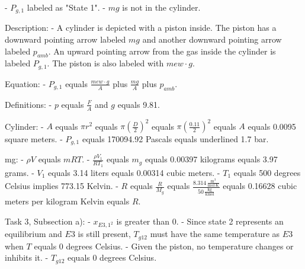 - \( P_{g,1} \) labeled as "State 1".
- \( mg \) is not in the cylinder.

Description:
- A cylinder is depicted with a piston inside. The piston has a downward pointing arrow labeled \( mg \) and another downward pointing arrow labeled \( p_{amb} \). An upward pointing arrow from the gas inside the cylinder is labeled \( P_{g,1} \). The piston is also labeled with \( mew \cdot g \).

Equation:
- \( P_{g,1} \) equals \( \frac{mew \cdot g}{A} \) plus \( \frac{mg}{A} \) plus \( p_{amb} \).

Definitions:
- \( p \) equals \( \frac{F}{A} \) and \( g \) equals 9.81.

Cylinder:
- \( A \) equals \( \pi r^2 \) equals \( \pi \left( \frac{D}{2} \right)^2 \) equals \( \pi \left( \frac{0.11}{2} \right)^2 \) equals \( A \) equals 0.0095 square meters.
- \( P_{g,1} \) equals 170094.92 Pascals equals underlined 1.7 bar.

mg:
- \( \rho V \) equals \( mRT \).
- \( \frac{\rho V_1}{RT_1} \) equals \( m_g \) equals 0.00397 kilograms equals 3.97 grams.
- \( V_1 \) equals 3.14 liters equals 0.00314 cubic meters.
- \( T_1 \) equals 500 degrees Celsius implies 773.15 Kelvin.
- \( R \) equals \( \frac{R}{M_g} \) equals \( \frac{8.314 \, \frac{\text{m}^3}{\text{mol} \cdot \text{K}}}{50 \, \frac{\text{kg}}{\text{kmol}}} \) equals 0.16628 cubic meters per kilogram Kelvin equals \( R \).

Task 3, Subsection a):
- \( x_{E3,1^2} \) is greater than 0.
- Since state 2 represents an equilibrium and \( E3 \) is still present, \( T_{g12} \) must have the same temperature as \( E3 \) when \( T \) equals 0 degrees Celsius.
- Given the piston, no temperature changes or inhibits it.
- \( T_{g12} \) equals 0 degrees Celsius.